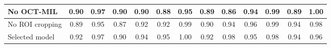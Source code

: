 \documentclass[sn-mathphys]{sn-jnl}%
\theoremstyle{thmstyleone}%
\theoremstyle{thmstyletwo}%
\theoremstyle{thmstylethree}%
\begin{document}
\begin{table}[!t]
{\begin{tabular}{lcccccccccccc}
            No OCT-MIL
                                                      & 0.90 & 0.97 & 0.90 & 0.90
                                                      & 0.88 & 0.95 & 0.89 & 0.86
                                                      & 0.94 & 0.99 & 0.89 & 1.00 \\
            \hline
            No ROI cropping
                                                      & 0.89 & 0.95 & 0.87 & 0.92
                                                      & 0.92 & 0.99 & 0.90 & 0.94
                                                      & 0.96 & 0.99 & 0.94 & 0.98 \\
            \hline
            Selected model
                                                      & 0.92 & 0.97 & 0.90 & 0.94
                                                      & 0.95 & 1.00 & 0.92 & 0.98
                                                      & 0.95 & 0.98 & 0.94 & 0.96 \\
            \hline
        \end{tabular}}
\end{table}
\end{document}
